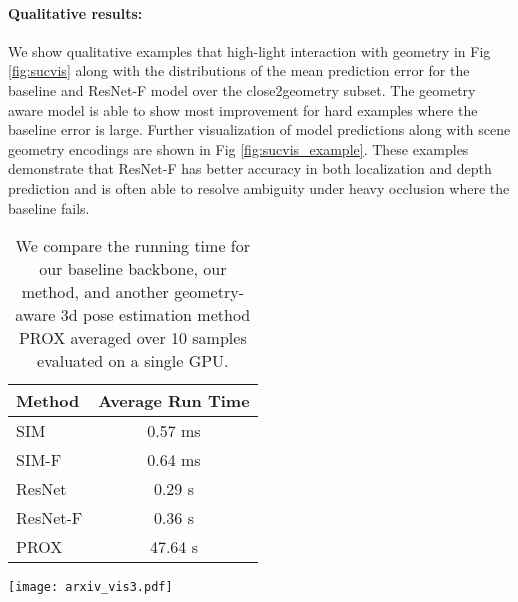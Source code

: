 \documentclass[times,referee,twocolumn,final,authoryear]{elsarticle}
\begin{document}
\paragraph{Qualitative results:} We show qualitative examples that high-light interaction
with geometry in Fig \ref{fig:sucvis} along with the distributions of the mean prediction 
error for the baseline and ResNet-F model over the close2geometry subset.  The geometry 
aware model is able to show most improvement for hard examples where the baseline error is large.
Further visualization of model predictions along with scene geometry encodings are shown in 
Fig \ref{fig:sucvis_example}. These examples demonstrate that ResNet-F has
better accuracy in both  localization and depth prediction and is often able to
resolve ambiguity under heavy occlusion where the baseline fails.

\begin{table}
\begin{center}
\small
\begin{tabular}{l|c}
\hline
 Method & Average Run Time \\
 \hline
 SIM \cite{simple} & 0.57 ms\\
\hline
 SIM-F & 0.64 ms\\
 \hline
 ResNet \cite{Zhou_2017_ICCV} & 0.29 s\\
\hline
 ResNet-F & 0.36 s\\
  \hline
PROX \cite{mpii_scene} & 47.64 s\\
\hline
\end{tabular}
\end{center}
\caption{We compare the running time for our baseline backbone, our method, and another geometry-aware 3d pose estimation method PROX \cite{mpii_scene} averaged over 10 samples evaluated on a single GPU.}
\label{table:runningtime}
\end{table}


\begin{figure*}[!bht]
\begin{center}
   \texttt{[image: arxiv\_vis3.pdf]}
\end{center}
   \caption{Visualization of the input images with the ground
   truth pose overlaid in the same view (blue and red indicate right and left sides
   respectively). Columns 2-4 depict the first 3 layers of
   multi-layer depth map. Column 5 is the baseline model prediction overlaid on the
   1st layer multi-layer depth map. Column 6 is the ResNet-F model prediction.
   The red rectangles highlight locations where the baseline model generates 
   pose predictions that violate scene geometry or are otherwise improved by
   incorporating geometric input. }
\label{fig:sucvis_example}
\end{figure*}
\end{document}
